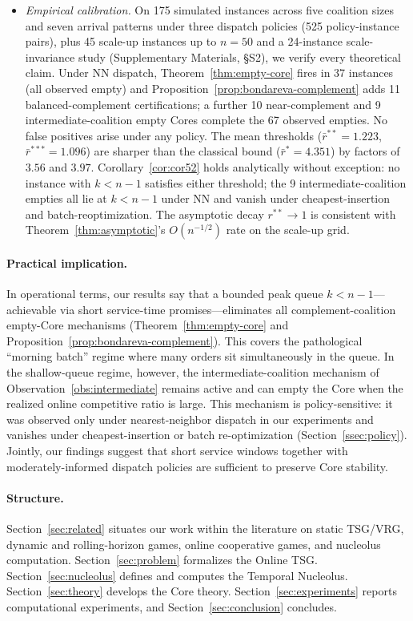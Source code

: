 \documentclass[11pt]{article}
\theoremstyle{plain}
\theoremstyle{definition}
\theoremstyle{remark}
\begin{document}
\begin{itemize}[leftmargin=1.5em]
\item[\textbf{C4.}] \emph{Empirical calibration.} On 175 simulated instances across five coalition sizes and seven arrival patterns under three dispatch policies (525 policy-instance pairs), plus 45 scale-up instances up to $n=50$ and a 24-instance scale-invariance study (Supplementary Materials, \S S2), we verify every theoretical claim. Under NN dispatch, Theorem~\ref{thm:empty-core} fires in 37 instances (all observed empty) and Proposition~\ref{prop:bondareva-complement} adds 11 balanced-complement certifications; a further 10 near-complement and 9 intermediate-coalition empty Cores complete the 67 observed empties. No false positives arise under any policy. The mean thresholds ($\bar r^{\ast\ast}=1.223$, $\bar r^{\ast\ast\ast}=1.096$) are sharper than the classical bound ($\bar r^{\ast}=4.351$) by factors of $3.56$ and $3.97$. Corollary~\ref{cor:cor52} holds analytically without exception: no instance with $k<n-1$ satisfies either threshold; the 9 intermediate-coalition empties all lie at $k<n-1$ under NN and vanish under cheapest-insertion and batch-reoptimization. The asymptotic decay $r^{\ast\ast}\to 1$ is consistent with Theorem~\ref{thm:asymptotic}'s $O(n^{-1/2})$ rate on the scale-up grid.
\end{itemize}

\paragraph{Practical implication.} In operational terms, our results say that a bounded peak queue $k<n-1$---achievable via short service-time promises---eliminates all complement-coalition empty-Core mechanisms (Theorem~\ref{thm:empty-core} and Proposition~\ref{prop:bondareva-complement}). This covers the pathological ``morning batch'' regime where many orders sit simultaneously in the queue. In the shallow-queue regime, however, the intermediate-coalition mechanism of Observation~\ref{obs:intermediate} remains active and can empty the Core when the realized online competitive ratio is large. This mechanism is policy-sensitive: it was observed only under nearest-neighbor dispatch in our experiments and vanishes under cheapest-insertion or batch re-optimization (Section~\ref{ssec:policy}). Jointly, our findings suggest that short service windows together with moderately-informed dispatch policies are sufficient to preserve Core stability.

\paragraph{Structure.} Section~\ref{sec:related} situates our work within the literature on static TSG/VRG, dynamic and rolling-horizon games, online cooperative games, and nucleolus computation. Section~\ref{sec:problem} formalizes the Online TSG. Section~\ref{sec:nucleolus} defines and computes the Temporal Nucleolus. Section~\ref{sec:theory} develops the Core theory. Section~\ref{sec:experiments} reports computational experiments, and Section~\ref{sec:conclusion} concludes.
\end{document}
